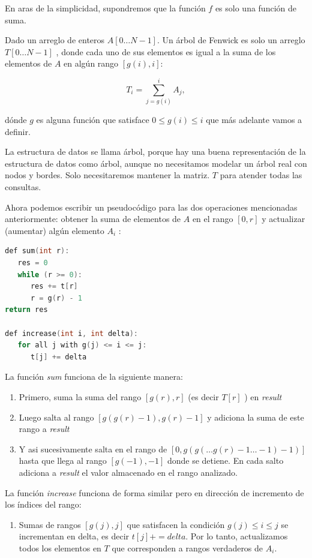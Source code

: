En aras de la simplicidad, supondremos que la función $f$ es solo una función de suma.

Dado un arreglo de enteros $A[0 \dots N-1]$. Un árbol de Fenwick es solo un arreglo $T[0 \dots N-1]$ 
, donde cada uno de sus elementos es igual a la suma de los elementos de $A$ en algún rango 
$[g(i),i]$:

$$T_i = \sum_{j = g(i)}^{i}{A_j},$$

dónde $g$ es alguna función que satisface $0 \le g(i) \le i$ que más adelante vamos a definir.

La estructura de datos se llama árbol, porque hay una buena representación de la estructura de datos como árbol, aunque no necesitamos modelar un árbol real con nodos y bordes. Solo necesitaremos mantener la matriz. $T$ para atender todas las consultas.

Ahora podemos escribir un pseudocódigo para las dos operaciones mencionadas anteriormente: obtener la suma de elementos de $A$ en el rango $[0, r]$ y actualizar (aumentar) algún elemento $A_i$ :
\begin{lstlisting}[language=C++]
def sum(int r):
   res = 0
   while (r >= 0):
      res += t[r]
      r = g(r) - 1
return res

def increase(int i, int delta):
   for all j with g(j) <= i <= j:
      t[j] += delta
\end{lstlisting}

La función \emph{sum} funciona de la siguiente manera:

\begin{enumerate}
	\item Primero, suma la suma del rango $[g(r), r]$ (es decir $T[r]$ ) en \emph{result}
	\item Luego salta al rango $[g(g(r)-1), g(r)-1]$ y adiciona la suma de este rango a \emph{result}
	\item Y asi sucesivamente salta en el rango de $[0, g(g( \dots g(r)-1\dots-1)-1)]$  hasta que llega al rango $[g(-1), -1]$ donde se detiene. En cada salto adiciona a \emph{result} el valor almacenado en el rango analizado. 
\end{enumerate}

La función \emph{increase} funciona de forma similar pero en dirección de incremento de los índices del rango:

\begin{enumerate}
	\item Sumas de rangos $[g(j),j]$ que satisfacen la condición $g(j)\le i \le j$ se incrementan 
	en delta, es decir $t[j]+= delta$. Por lo tanto, actualizamos todos los elementos en $T$ que 
	corresponden a rangos verdaderos de $A_i$.
\end{enumerate}


